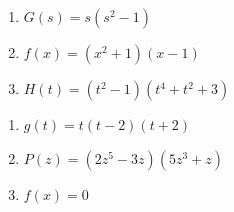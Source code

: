 \begin{multicols}{3}
\begin{enumerate}
\setcounter{enumi}{\value{HW}}

\item $G(s) = s(s^2 - 1)$
\item $f(x) = (x^2+1)(x-1)$
\item $H(t) = (t^2-1)(t^4+t^2+3)$

\setcounter{HW}{\value{enumi}}
\end{enumerate}
\end{multicols}

\begin{multicols}{3}
\begin{enumerate}
\setcounter{enumi}{\value{HW}}

\item $g(t) = t(t-2)(t+2)$
\item $P(z) = (2z^{5} - 3z)(5z^3+z)$ 
\item $f(x) =0$  \label{evenoddornotpolylast}

\setcounter{HW}{\value{enumi}}
\end{enumerate}
\end{multicols}


